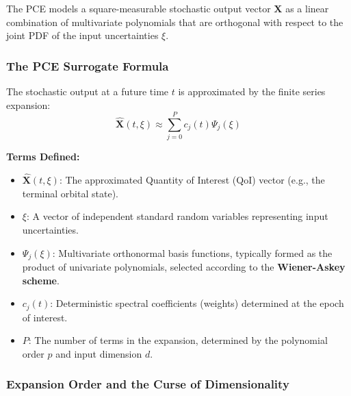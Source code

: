 \documentclass[
  letterpaper,
  DIV=11,
  numbers=noendperiod,
  oneside]{scrartcl}
\begin{document}
The PCE models a square-measurable stochastic output vector
\(\mathbf{X}\) as a linear combination of multivariate polynomials that
are orthogonal with respect to the joint PDF of the input uncertainties
\(\xi\).


\subsubsection{The PCE Surrogate
Formula}\label{the-pce-surrogate-formula}

The stochastic output at a future time \(t\) is approximated by the
finite series expansion: \[
\hat{\mathbf{X}}(t, \xi) \approx \sum_{j=0}^{P} c_j(t) \Psi_j(\xi)
\]

\textbf{Terms Defined:}

\begin{itemize}
\item
  \(\hat{\mathbf{X}}(t, \xi)\): The approximated Quantity of Interest
  (QoI) vector (e.g., the terminal orbital state).
\item
  \(\xi\): A vector of independent standard random variables
  representing input uncertainties.
\item
  \(\Psi_j(\xi)\): Multivariate orthonormal basis functions, typically
  formed as the product of univariate polynomials, selected according to
  the \textbf{Wiener-Askey scheme}.
\item
  \(c_j(t)\): Deterministic spectral coefficients (weights) determined
  at the epoch of interest.
\item
  \(P\): The number of terms in the expansion, determined by the
  polynomial order \(p\) and input dimension \(d\).
\end{itemize}

\subsubsection{Expansion Order and the Curse of
Dimensionality}\label{expansion-order-and-the-curse-of-dimensionality}
\end{document}
